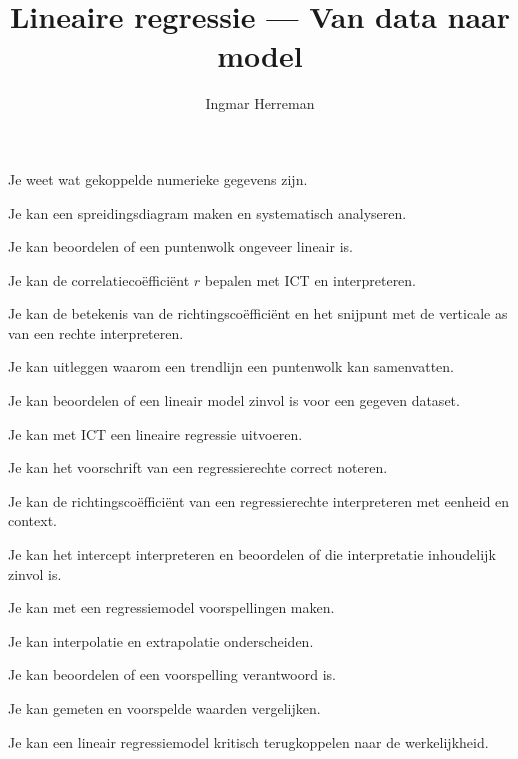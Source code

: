 \documentclass{ximera}
\title{Lineaire regressie --- Van data naar model}
\author{Ingmar Herreman}
\begin{document}













\maketitle

\begin{voorkennis}
  \item Je weet wat gekoppelde numerieke gegevens zijn.
  \item Je kan een spreidingsdiagram maken en systematisch analyseren.
  \item Je kan beoordelen of een puntenwolk ongeveer lineair is.
  \item Je kan de correlatiecoëfficiënt $r$ bepalen met ICT en interpreteren.
  \item Je kan de betekenis van de richtingscoëfficiënt en het snijpunt met de verticale as van een rechte interpreteren.
\end{voorkennis}

\begin{leerdoelen}
  \item Je kan uitleggen waarom een trendlijn een puntenwolk kan samenvatten.
  \item Je kan beoordelen of een lineair model zinvol is voor een gegeven dataset.
  \item Je kan met ICT een lineaire regressie uitvoeren.
  \item Je kan het voorschrift van een regressierechte correct noteren.
  \item Je kan de richtingscoëfficiënt van een regressierechte interpreteren met eenheid en context.
  \item Je kan het intercept interpreteren en beoordelen of die interpretatie inhoudelijk zinvol is.
  \item Je kan met een regressiemodel voorspellingen maken.
  \item Je kan interpolatie en extrapolatie onderscheiden.
  \item Je kan beoordelen of een voorspelling verantwoord is.
  \item Je kan gemeten en voorspelde waarden vergelijken.
  \item Je kan een lineair regressiemodel kritisch terugkoppelen naar de werkelijkheid.
\end{leerdoelen}
\end{document}
